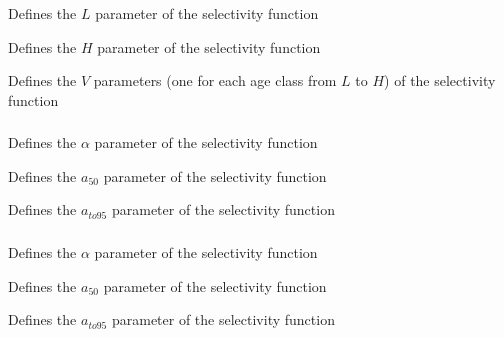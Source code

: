  {Defines the $L$ parameter of the selectivity function}

 {Defines the $H$ parameter of the selectivity function}

 {Defines the $V$ parameters (one for each age class from $L$ to $H$) of the selectivity function}

\subsubsection[Logistic]{}

 {Defines the $\alpha$ parameter of the selectivity function}

 {Defines the $a_{50}$ parameter of the selectivity function}

 {Defines the $a_{to95}$ parameter of the selectivity function}

\subsubsection[InverseLogistic]{}

 {Defines the $\alpha$ parameter of the selectivity function}

 {Defines the $a_{50}$ parameter of the selectivity function}

 {Defines the $a_{to95}$ parameter of the selectivity function}

\subsubsection[Logistic producing]{}

